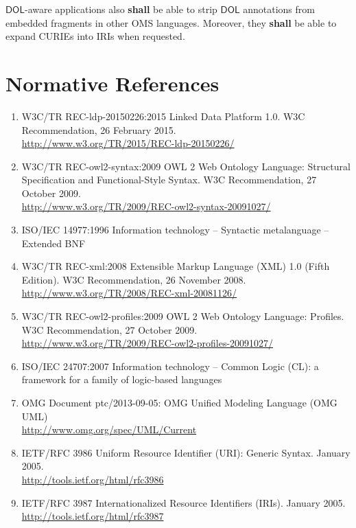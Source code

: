 \documentclass[10pt,fleqn,final]{scrreprt}
\newcommand*{\shall}{\textbf{shall}\xspace}
\newcommand*{\DOL}{\ensuremath{\mathsf{DOL}}\xspace}
\newcommand{\clause}[1]{\chapter{#1}}
\begin{document}
\DOL-aware applications also  \shall  be able to strip \DOL annotations
from embedded fragments in other OMS languages. Moreover, they  \shall 
be able to expand CURIEs into IRIs when requested.


\clause{Normative References}
\begin{enumerate}[label=\bfseries NR\arabic*:]
  \item{W3C/TR REC-ldp-20150226:2015} {Linked Data Platform 1.0. W3C Recommendation, 26 February 2015.\\ \url{http://www.w3.org/TR/2015/REC-ldp-20150226/}}
  \item{W3C/TR REC-owl2-syntax:2009} {OWL 2 Web Ontology Language: Structural Specification and Functional-Style Syntax. W3C Recommendation, 27 October 2009.\\ \url{http://www.w3.org/TR/2009/REC-owl2-syntax-20091027/}}
  \item{ISO/IEC 14977:1996} {Information technology – Syntactic metalanguage – Extended BNF}
  \item{W3C/TR REC-xml:2008} {Extensible Markup Language (XML) 1.0 (Fifth Edition). W3C Recommendation, 26 November 2008. \\
  \url{http://www.w3.org/TR/2008/REC-xml-20081126/}}
  \item{W3C/TR REC-owl2-profiles:2009} {OWL 2 Web Ontology Language: Profiles. W3C Recommendation, 27 October 2009. \\
  \url{http://www.w3.org/TR/2009/REC-owl2-profiles-20091027/}}
  \item{ISO/IEC 24707:2007} {Information technology – Common Logic (CL): a framework for a family of logic-based languages}
  \item{OMG Document ptc/2013-09-05:} {OMG Unified Modeling Language (OMG UML)\\
  \url{http://www.omg.org/spec/UML/Current}}
  \item{IETF/RFC 3986} {Uniform Resource Identifier (URI): Generic Syntax. January 2005.\\ \url{http://tools.ietf.org/html/rfc3986}}
  \item{IETF/RFC 3987} {Internationalized Resource Identifiers (IRIs). January 2005.\\ \url{http://tools.ietf.org/html/rfc3987}}

\end{enumerate}
\end{document}
